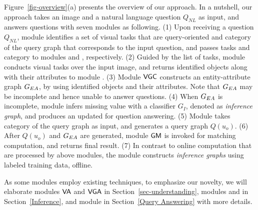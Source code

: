 
Figure~\ref{fig-overview}(a) presents the overview of our approach. In a nutshell, our approach takes an image and a natural language question $Q_{NL}$ as input, and answers questions with seven modules as following. (1) Upon receiving a question $Q_{NL}$, module  identifies a set of visual tasks that are query-oriented and category of the query graph that corresponds to the input question, and passes tasks and category to modules  and , respectively. (2) Guided by the list of tasks, module  conducts visual tasks over the input image, and returns identified objects along with their attributes to module . (3) Module ${\mathsf{VGC}}$ constructs an entity-attribute graph $G_{EA}$, by using identified objects and their attributes. Note that $G_{EA}$ may be incomplete and hence unable to answer questions. (4) When $G_{EA}$ is incomplete, module  infers missing value with a classifier $G_I$, denoted as {\em inference graph}, and produces an updated  for question answering. (5) Module  takes category of the query graph as input, and generates a query graph $Q(u_o)$. (6) After $Q(u_o)$ and $G_{EA}$ are generated, module ${\mathsf{GM}}$ is invoked for matching computation, and returns final result. (7) In contrast to online computation that are processed by above modules, the module  constructs {\em inference graphs} using labeled training data, offline. 

{\color{red} As some modules employ existing techniques, to emphasize our novelty, we will elaborate modules ${\mathsf{VA}}$ and ${\mathsf{VGA}}$ in Section~\ref{sec-understanding}, modules  and  in Section~\ref{Inference}, and module  in Section~\ref{Query Answering} with more details. }